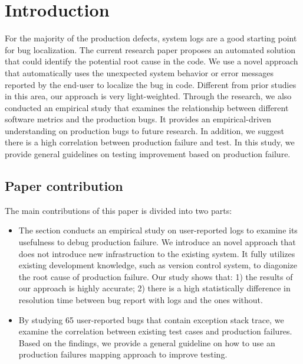 \section{Introduction}

	For the majority of the production defects, system logs are a good starting point for bug localization. The current research paper proposes an automated solution that could identify the potential root cause in the code. We use a novel approach that automatically uses the unexpected system behavior or error messages reported by the end-user to localize the bug in code. Different from prior studies in this area, our approach is very light-weighted. Through the research, we also conducted an empirical study that examines the relationship between different software metrics and the production bugs. It provides an empirical-driven understanding on production bugs to future research. In addition, we suggest there is a high correlation between production failure and test. In this study, we provide general guidelines on testing improvement based on production failure.

\subsection{Paper contribution}

	The main contributions of this paper is divided into two parts:
		\vspace{-0.1cm}
		\begin{itemize} \itemsep 0em
		 \item {} The section conducts an empirical study on user-reported logs to examine its usefulness to debug production failure. We introduce an novel approach that does not introduce new infrastruction to the existing system. It fully utilizes existing development knowledge, such as version control system, to diagonize the root cause of production failure. Our study shows that: 1) the results of our approach is highly accurate; 2) there is a high statistically difference in resolution time between bug report with logs and the ones without.
		 \item {} By studying 65 user-reported bugs that contain exception stack trace, we examine the correlation between existing test cases and production failures. Based on the findings, we provide a general guideline on how to use an production failures mapping approach to improve testing. 
		\end{itemize}

